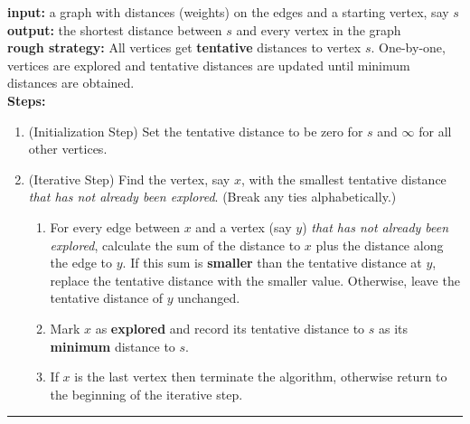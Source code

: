 \documentclass[12pt]{article}
\renewcommand{\emph}[1]{\textsf{\textbf{#1}}}
\begin{document}

\textbf{input:} a graph with distances (weights) on the edges and a starting vertex, say $s$\\
\textbf{output:} the shortest distance between $s$ and every vertex in the graph\\
\textbf{rough strategy:} All vertices get \emph{tentative} distances to vertex $s$. One-by-one, vertices are explored and tentative distances are updated until minimum distances are obtained.\\
\textbf{Steps:}
\begin{enumerate}
	\item (Initialization Step) Set the tentative distance to be zero for $s$ and $\infty$ for all other vertices.
	\item (Iterative Step) Find the vertex, say $x$, with the smallest tentative distance \textit{that has not already been explored}. (Break any ties alphabetically.)
		\begin{enumerate} 
		\item For every edge between $x$ and a vertex (say $y$) \textit{that has not already been explored}, calculate the sum of the distance to $x$ plus the distance along the edge to $y.$ If this sum is \emph{smaller} than the tentative distance at $y$, replace the tentative distance with the smaller value. Otherwise, leave the tentative distance of $y$ unchanged.
		\item Mark $x$ as \emph{explored} and record its tentative distance to $s$ as its \emph{minimum} distance to $s.$
		\item If $x$ is the last vertex then terminate the algorithm, otherwise return to the beginning of the iterative step.
		\end{enumerate} 
\end{enumerate}

\hrule

\vspace{1cm}
\end{document}
